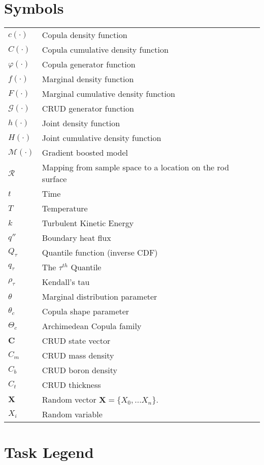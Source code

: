 \section*{Symbols}
\begin{tabular}{l l}
$c(\cdot)$ & Copula density function \\
$C(\cdot)$ & Copula cumulative density function \\
$\varphi(\cdot)$ & Copula generator function \\
$f(\cdot)$ & Marginal density function \\
$F(\cdot)$ & Marginal cumulative density function \\
$\mathcal G(\cdot)$ & CRUD generator function \\
$h(\cdot)$ & Joint density function \\
$H(\cdot)$ & Joint cumulative density function \\
$\mathcal M(\cdot)$ & Gradient boosted model \\
$\mathcal R$ & Mapping from sample space to a location on the rod surface \\
$t$ & Time \\
$T$ & Temperature \\
$k$ & Turbulent Kinetic Energy \\
$q''$ & Boundary heat flux \\
$Q_{\tau}$ & Quantile function (inverse CDF) \\
$q_{\tau}$ & The $\tau^{th}$ Quantile \\
$\rho_{\tau}$ & Kendall's tau \\
$\theta$ & Marginal distribution parameter \\
$\theta_c$ & Copula shape parameter \\
$\Theta_c$ & Archimedean Copula family \\
$\mathbf C$ & CRUD state vector \\
$C_m$ & CRUD mass density \\
$C_b$ & CRUD boron density \\
$C_t$ & CRUD thickness \\
$\mathbf X$ & Random vector $\mathbf X = \{X_0, ... X_n\}$. \\
$X_i$ & Random variable \\
\end{tabular}


\section*{Task Legend}

